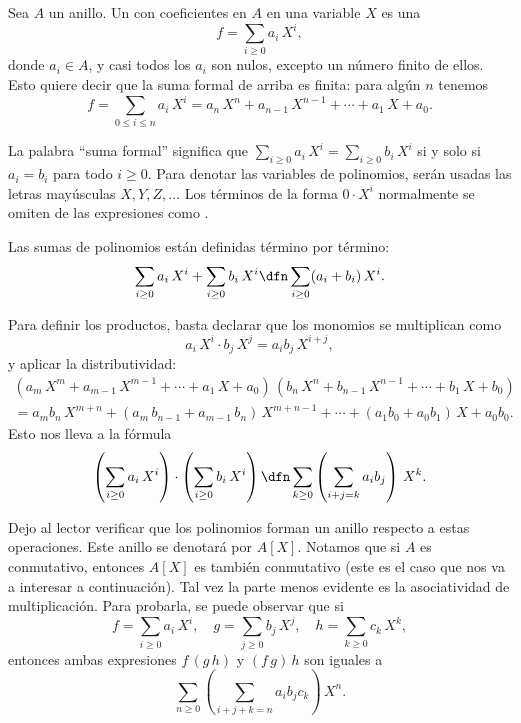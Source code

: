 \begin{ejemplo}
  Sea $A$ un anillo. Un  con coeficientes en
  $A$ en una variable $X$ es una 
  $$f = \sum_{i\ge 0} a_i\,X^i,$$
  donde $a_i \in A$, y casi todos los $a_i$ son nulos, excepto un número finito
  de ellos. Esto quiere decir que la suma formal de arriba es finita: para algún
  $n$ tenemos
  \begin{equation}
    \label{eqn:polinomio-expresion-finita}
    f = \sum_{0 \le i\le n} a_i\,X^i =  a_n\,X^n + a_{n-1}\,X^{n-1} + \cdots + a_1\,X + a_0.
  \end{equation}

  La palabra ``suma formal'' significa que
  $\sum_{i\ge 0} a_i\,X^i = \sum_{i\ge 0} b_i\,X^i$ si y solo si $a_i = b_i$
  para todo $i \ge 0$. Para denotar las variables de polinomios, serán usadas
  las letras mayúsculas $X,Y,Z,\ldots$ Los términos de la forma $0\cdot X^i$
  normalmente se omiten de las expresiones como
  .

  Las sumas de polinomios están definidas término por término:
  $$\sum_{i\ge 0} a_i\,X^i + \sum_{i\ge 0} b_i\,X^i \dfn \sum_{i\ge 0} (a_i + b_i)\,X^i.$$

  Para definir los productos, basta declarar que los monomios se multiplican
  como
  $$a_i\,X^i \cdot b_j\,X^j = a_i b_j \, X^{i+j},$$
  y aplicar la distributividad:
  \begin{multline*}
    \left(a_m\,X^m + a_{m-1}\,X^{m-1} + \cdots + a_1\,X + a_0\right) \, \left(b_n\,X^n + b_{n-1}\,X^{n-1} + \cdots + b_1\,X + b_0\right) \\
    = a_m b_n\,X^{m+n} + (a_m\,b_{n-1} + a_{m-1}\,b_n)\,X^{m+n-1} + \cdots + (a_1 b_0 + a_0 b_1)\,X + a_0 b_0.
  \end{multline*}
  Esto nos lleva a la fórmula
  \[ \left(\sum_{i\ge 0} a_i\,X^i\right) \cdot \left(\sum_{i\ge 0} b_i\,X^i\right) \dfn
  \sum_{k\ge 0} \left(\sum_{i+j = k} a_i b_j\right)\,X^k. \]

  Dejo al lector verificar que los polinomios forman un anillo respecto a estas
  operaciones. Este anillo se denotará por $A [X]$. Notamos que si $A$ es
  conmutativo, entonces $A [X]$ es también conmutativo (este es el caso que nos
  va a interesar a continuación). Tal vez la parte menos evidente es la
  asociatividad de multiplicación. Para probarla, se puede observar que si
  \[ f = \sum_{i\ge 0} a_i\,X^i, \quad
  g = \sum_{j\ge 0} b_j\,X^j, \quad
  h = \sum_{k\ge 0} c_k\,X^k, \]
  entonces ambas expresiones $f\,(g \, h)$ y $(f \, g)\,h$ son iguales a
  $$\sum_{n\ge 0} \left(\sum_{i+j+k = n} a_i b_j c_k\right)\,X^n.$$


\end{ejemplo}
